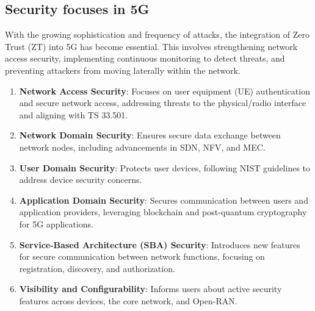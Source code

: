 \documentclass{report}
\begin{document}
\subsection{Security focuses in 5G}
    With the growing sophistication and frequency of attacks, the integration of Zero Trust (ZT) into 5G has become essential. This involves strengthening network access security, implementing continuous monitoring to detect threats, and preventing attackers from moving laterally within the network.\\
    \begin{enumerate}
        \item \textbf{Network Access Security}: Focuses on user equipment (UE) authentication and secure network access, addressing threats to the physical/radio interface and aligning with TS 33.501.
        \item \textbf{Network Domain Security}: Ensures secure data exchange between network nodes, including advancements in SDN, NFV, and MEC.
        \item \textbf{User Domain Security}: Protects user devices, following NIST guidelines to address device security concerns.
        \item \textbf{Application Domain Security}: Secures communication between users and application providers, leveraging blockchain and post-quantum cryptography for 5G applications.
        \item \textbf{Service-Based Architecture (SBA) Security}: Introduces new features for secure communication between network functions, focusing on registration, discovery, and authorization.
        \item \textbf{Visibility and Configurability}: Informs users about active security features across devices, the core network, and Open-RAN.
\end{enumerate}
\end{document}
